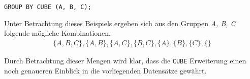 \texttt{GROUP BY CUBE (A, B, C);}

Unter Betrachtung dieses Beispiels ergeben sich aus den Gruppen \textit{A, B, C}
folgende mögliche Kombinationen.
\begin{align*}
	\{ A, B, C\}, \{A, B\}, \{A, C\}, \{B, C\}, \{A\}, \{B\}, \{C\}, \{ \}
\end{align*}

Durch Betrachtung dieser Mengen wird klar, dass die \texttt{CUBE} Erweiterung einen
noch genaueren Einblick in die vorliegenden Datensätze gewährt.
